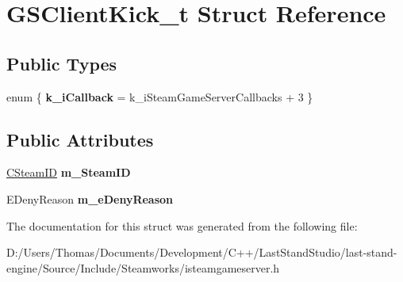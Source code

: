 \hypertarget{structGSClientKick__t}{}\section{G\+S\+Client\+Kick\+\_\+t Struct Reference}
\label{structGSClientKick__t}
\subsection*{Public Types}
\begin{DoxyCompactItemize}
\item 
\hypertarget{structGSClientKick__t_ae2b3145f76d6629fe7f2b6aafc6bb3fd}{}enum \{ {\bfseries k\+\_\+i\+Callback} = k\+\_\+i\+Steam\+Game\+Server\+Callbacks + 3
 \}\label{structGSClientKick__t_ae2b3145f76d6629fe7f2b6aafc6bb3fd}

\end{DoxyCompactItemize}
\subsection*{Public Attributes}
\begin{DoxyCompactItemize}
\item 
\hypertarget{structGSClientKick__t_a7c5ef2c586c7a23ce900fd5c7d8c5622}{}\hyperlink{classCSteamID}{C\+Steam\+I\+D} {\bfseries m\+\_\+\+Steam\+I\+D}\label{structGSClientKick__t_a7c5ef2c586c7a23ce900fd5c7d8c5622}

\item 
\hypertarget{structGSClientKick__t_a4db1ea7163ff721fc348aa27b8c7a256}{}E\+Deny\+Reason {\bfseries m\+\_\+e\+Deny\+Reason}\label{structGSClientKick__t_a4db1ea7163ff721fc348aa27b8c7a256}

\end{DoxyCompactItemize}


The documentation for this struct was generated from the following file\+:\begin{DoxyCompactItemize}
\item 
D\+:/\+Users/\+Thomas/\+Documents/\+Development/\+C++/\+Last\+Stand\+Studio/last-\/stand-\/engine/\+Source/\+Include/\+Steamworks/isteamgameserver.\+h\end{DoxyCompactItemize}
